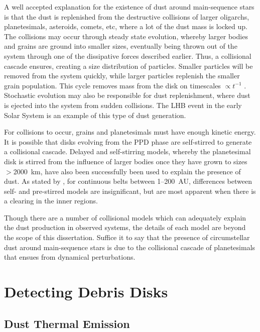     A well accepted explanation for the existence of dust around main-sequence stars is that the dust is replenished from the destructive collisions of larger oligarchs, planetesimals, asteroids, comets, etc, where a lot of the dust mass is locked up. The collisions may occur through steady state evolution, whereby larger bodies and grains are ground into smaller sizes, eventually being thrown out of the system through one of the dissipative forces described earlier. Thus, a collisional cascade ensures, creating a size distribution of particles. Smaller particles will be removed from the system quickly, while larger particles replenish the smaller grain population. This cycle removes mass from the disk on timescales $\propto t^{-1}$ \citep{Wyatt2007}. Stochastic evolution may also be responsible for dust replenishment, where dust is ejected into the system from sudden collisions. The LHB event in the early Solar System is an example of this type of dust generation. 
    
    For collisions to occur, grains and planetesimals must have enough kinetic energy. It is possible that disks evolving from the PPD phase are self-stirred to generate a collisional cascade. Delayed and self-stirring models, whereby the planetesimal disk is stirred from the influence of larger bodies once they have grown to sizes $>$2000~km, have also been successfully been used to explain the presence of dust. As stated by \citet{Wyatt2008}, for continuous belts between 1--200~AU, differences between self- and pre-stirred models are insignificant, but are most apparent when there is a clearing in the inner regions.
    
    Though there are a number of collisional models which can adequately explain the dust production in observed systems, the details of each model are beyond the scope of this dissertation. Suffice it to say that the presence of circumstellar dust around main-sequence stars is due to the collisional cascade of planetesimals that ensues from dynamical perturbations.
    
\section{Detecting Debris Disks}\label{sec:detect_dd}

    \subsection{Dust Thermal Emission}

